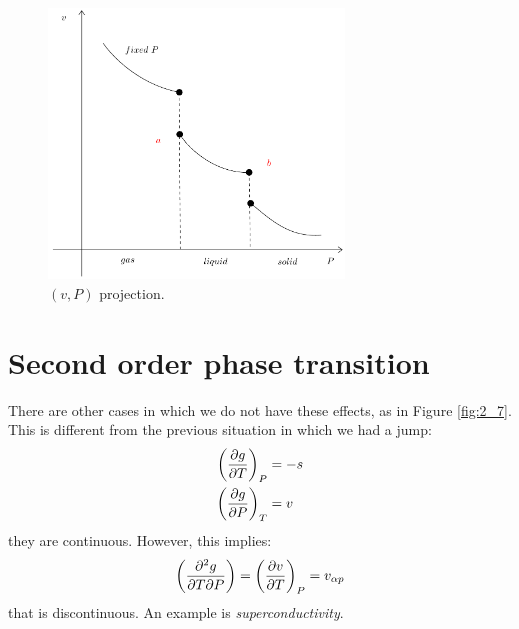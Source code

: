 \documentclass[../main/main.tex]{subfiles}
\begin{document}
\begin{figure}[h!]
\centering
\includegraphics[width=0.7\textwidth]{../lessons/2_image/6.pdf}
\caption{\label{fig:2_6} \( (v,P) \) projection.}
\end{figure}



\section{Second order phase transition}
There are other cases in which we do not have these effects, as in Figure \ref{fig:2_7}. This is different from the previous situation in which we had a jump:
\begin{subequations}
\begin{align}
  \qty(\pdv{g}{T} )_P &= -s \\
  \qty(\pdv{g}{P} )_T &= v
\end{align}
\end{subequations}
they are continuous. However, this implies:
\begin{equation}
  \qty(\pdv{g}{T}{P}  ) = \qty(\pdv{v}{T} )_P = v_{\alpha p}
  \label{eq:}
\end{equation}
that is discontinuous.
An example is \emph{superconductivity}.
\end{document}
